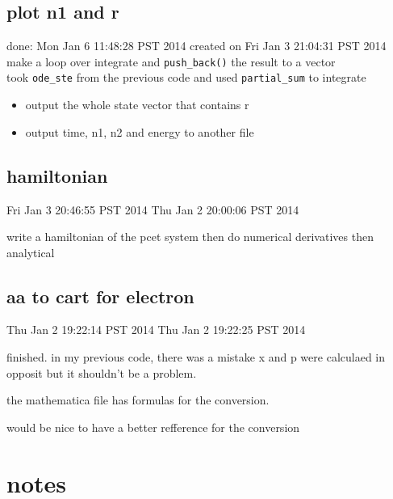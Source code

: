 \documentclass{article}
\let\Item\item
\renewcommand\item{\normalcolor\Item}
\newcommand\done{\color[RGB]{129, 180, 185} \ding{52} }
\begin{document}
\subsection{plot n1 and r}
done: Mon Jan  6 11:48:28 PST 2014
created on Fri Jan  3 21:04:31 PST 2014
\label{sub:plot_n1_and_r}
make a loop over integrate and \verb`push_back()` the result to a vector\\
took \verb`ode_ste` from the previous code and used \verb`partial_sum` to integrate\\
\begin{itemize}
  \item \done output the whole state vector that contains r
  \item \done output time, n1, n2 and energy to another file
\end{itemize}
\subsection{hamiltonian}
Fri Jan  3 20:46:55 PST 2014
Thu Jan  2 20:00:06 PST 2014
\label{sub:hamiltonian}

write a hamiltonian of the pcet system then do numerical derivatives then analytical

\subsection{aa to cart for electron}
Thu Jan  2 19:22:14 PST 2014
Thu Jan  2 19:22:25 PST 2014
\label{sub:aa_to_cart_for_electron}

finished. in my previous code, there was a mistake x and p were calculaed in opposit but it shouldn't be a problem.

the mathematica file has formulas for the conversion. 

would be nice to have a better refference for the conversion

\section{notes}
\end{document}
